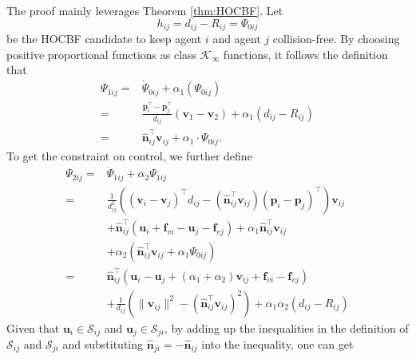 \documentclass{ifacconf}
\begin{document}
\begin{pf}
The proof mainly leverages Theorem \ref{thm:HOCBF}.
Let
\begin{equation}
    h_{ij} = d_{ij} - R_{ij} = \Psi_{0ij}
\end{equation}
be the HOCBF candidate to keep agent $i$ and agent $j$ collision-free.
By choosing positive proportional functions as class $\mathcal{K}_{\infty}$ functions, it follows the definition that
\begin{equation}
\begin{aligned}
      \Psi_{1ij} =& \dot{\Psi}_{0ij} + \alpha_1 (\Psi_{0ij}) \\
                 =& \frac{\boldsymbol{p}_i^{\top} - \boldsymbol{p}_j^\top}{d_{ij}} (\boldsymbol{v}_1 - \boldsymbol{v}_2) + \alpha_1 (d_{ij} - R_{ij}) \\
                 =&  \hat{\boldsymbol{n}}_{ij}^\top \boldsymbol{v}_{ij} + \alpha_1 \cdot \Psi_{0ij}.
\end{aligned}
\end{equation}
To get the constraint on control, we further define
\begin{equation} \label{eqn:psiDefinition}
   \begin{aligned}
      \Psi_{2ij} =& \dot{\Psi}_{1ij} + \alpha_2 \Psi_{1ij} \\
                 =& \frac{1}{d_{ij}^2}\left( (\boldsymbol{v}_i - \boldsymbol{v}_j)^{\top}d_{ij} - (\hat{\boldsymbol{n}}_{ij}^\top \boldsymbol{v}_{ij})(\boldsymbol{p}_i - \boldsymbol{p}_j)^{\top} \right) \boldsymbol{v}_{ij} \\
                 &+ \hat{\boldsymbol{n}}_{ij}^\top (\boldsymbol{u}_i + \boldsymbol{f}_{vi} - \boldsymbol{u}_j - \boldsymbol{f}_{vj}) + \alpha_1 \hat{\boldsymbol{n}}_{ij}^\top \boldsymbol{v}_{ij} \\
                 &+ \alpha_2 (\hat{\boldsymbol{n}}_{ij}^\top \boldsymbol{v}_{ij} + \alpha_1 \Psi_{0ij}) \\
                 =& \hat{\boldsymbol{n}}_{ij}^\top \left(\boldsymbol{u}_i - \boldsymbol{u}_j + (\alpha_1 + \alpha_2)\boldsymbol{v}_{ij} + \boldsymbol{f}_{vi} - \boldsymbol{f}_{vj} \right) \\
                 &+ \frac{1}{d_{ij}} \left( \|\boldsymbol{v}_{ij}\|^2 -  (\hat{\boldsymbol{n}}_{ij}^{\top}\boldsymbol{v}_{ij} )^2 \right) + \alpha_1 \alpha_2 (d_{ij} - R_{ij})
   \end{aligned}
\end{equation}
Given that $\boldsymbol{u}_i \in \mathcal{S}_{ij}$ and $\boldsymbol{u}_j \in \mathcal{S}_{ji}$, by adding up the inequalities in the definition of $\mathcal{S}_{ij}$ and $\mathcal{S}_{ji}$ and substituting $\hat{\boldsymbol{n}}_{ji} = -\hat{\boldsymbol{n}}_{ij}$ into the inequality, one can get

\end{pf}
\end{document}
